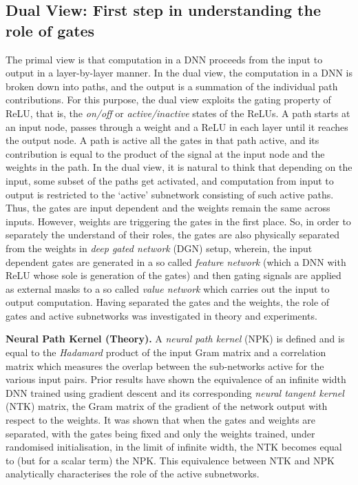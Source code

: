 \documentclass{article} %
\begin{document}
\subsection{Dual View: First step in understanding the role of gates}

The primal view is that computation in a DNN proceeds from the input to output in a layer-by-layer manner. In the dual view, the computation in a DNN is broken down into paths, and the output is a summation of the individual path contributions. For this purpose, the dual view exploits the gating property of ReLU, that is, the \emph{on/off} or \emph{active/inactive} states of the ReLUs. A path starts at an input node, passes through a weight and a ReLU in each layer until it reaches the output node. A path is active all the gates in that path active, and its contribution is equal to the product of the signal at the input node and the weights in the path. In the dual view, it is natural to think that depending on the input, some subset of the paths get activated, and computation from input to output is restricted to the `active' subnetwork consisting of such active paths. Thus, the gates are input dependent and the weights remain the same across inputs. However, weights are triggering the gates in the first place. So, in order to separately the understand of their roles, the gates are also physically separated from the weights in \emph{deep gated network} (DGN) setup, wherein, the input dependent gates are generated in a so called \emph{feature network} (which a DNN with ReLU whose sole  is  generation of the gates) and then gating signals are applied as external masks to a so called \emph{value network} which carries out the input to output computation. Having separated the gates and the weights, the role of gates and active subnetworks was investigated in theory and experiments.

\textbf{Neural Path Kernel (Theory).} A \emph{neural path kernel} (NPK) is defined and is equal to the \emph{Hadamard} product of the input Gram matrix and a correlation matrix which measures the overlap between the sub-networks active for the various input pairs. Prior results  \cite{arora2019exact,cao2019generalization,ntk} have shown the equivalence of an infinite width DNN trained using gradient descent and its corresponding \emph{neural tangent kernel} (NTK) matrix, the Gram matrix of the gradient of the network output with respect to the weights. It was shown that when the gates and weights are separated, with the gates being fixed and only the weights trained, under randomised initialisation, in the limit of infinite width, the NTK becomes equal to (but for a scalar term) the NPK. This equivalence between NTK and NPK analytically characterises the role of the active subnetworks.
\end{document}
